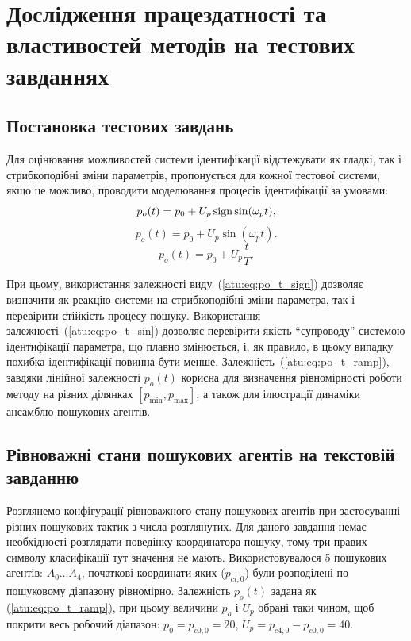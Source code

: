 

\section{Дослідження працездатності та властивостей методів на тестових завданнях} %

\subsection{Постановка тестових завдань}

Для оцінювання можливостей системи ідентифікації відстежувати як гладкі, так і
стрибкоподібні зміни параметрів, пропонується для кожної тестової системи, якщо
це можливо, проводити моделювання процесів ідентифікації за умовами:
%
\begin{equation}
  p_o(t) = p_0 +  U_{p} \operatorname*{sign} \sin( \omega_{p} t ),
  \label{atu:eq:po_t_sign}
\end{equation}
%
%
\begin{equation}
  p_o(t) = p_0 +  U_{p} \sin( \omega_{p} t ).
  \label{atu:eq:po_t_sin}
\end{equation}
%
\begin{equation}
  p_o(t) = p_0 +  U_{p} \frac{t}{T}.
  \label{atu:eq:po_t_ramp}
\end{equation}


При цьому, використання залежності виду~(\ref{atu:eq:po_t_sign}) дозволяє
визначити як реакцію системи на стрибкоподібні зміни параметра,
так і перевірити стійкість процесу пошуку. Використання
залежності~(\ref{atu:eq:po_t_sin}) дозволяє перевірити якість ``супроводу''
системою ідентифікації параметра, що плавно змінюється, і, як
правило, в цьому випадку похибка ідентифікації повинна бути
менше. Залежність~(\ref{atu:eq:po_t_ramp}), завдяки лінійної залежності
$p_o(t)$ корисна для визначення рівномірності роботи методу на
різних ділянках
$[p_{\min}, p_{\max}]$, а також для ілюстрації динаміки ансамблю
пошукових агентів.



\subsection{Рівноважні стани пошукових агентів на текстовій завданню} %

Розглянемо конфігурації рівноважного стану пошукових агентів при застосуванні
різних пошукових тактик з числа розглянутих. Для даного завдання немає
необхідності розглядати поведінку координатора пошуку, тому три правих символу
класифікації тут значення не мають.
Використовувалося 5 пошукових агентів: $A_0 \ldots A_4$, початкові
координати яких ($p_{ci,0}$) були розподілені по пошуковому діапазону
рівномірно. Залежність $p_o(t)$ задана як (\ref{atu:eq:po_t_ramp}), при
цьому величини $p_o$ і $U_p$ обрані таки чином, щоб покрити весь робочий
діапазон: $p_0 = p_{c0,0} = 20$, $U_p = p_{c4,0} - p_{c0,0} = 40$.

